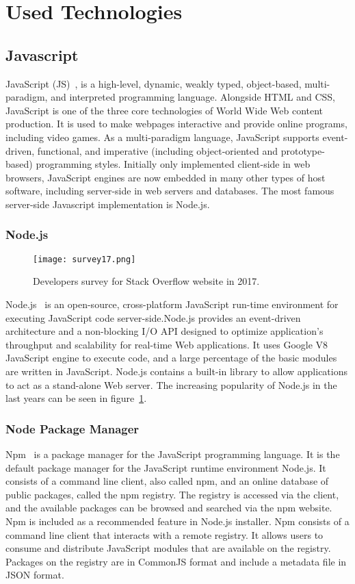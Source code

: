 \section{Used Technologies}

\subsection{Javascript}
JavaScript (JS)~\cite{crockford2008javascript}, is a high-level, dynamic, weakly typed, object-based, multi-paradigm, and interpreted programming language. Alongside HTML and CSS, JavaScript is one of the three core technologies of World Wide Web content production. It is used to make webpages interactive and provide online programs, including video games. As a multi-paradigm language, JavaScript supports event-driven, functional, and imperative (including object-oriented and prototype-based) programming styles. Initially only implemented client-side in web browsers, JavaScript engines are now embedded in many other types of host software, including server-side in web servers and databases. The most famous server-side Javascript implementation is Node.js.

\subsubsection{Node.js}
\begin{figure}
	\texttt{[image: survey17.png]}
	\caption{Developers survey for Stack Overflow website in 2017.}
	\label{survey17}
\end{figure}
Node.js~\cite{tilkov2010node} is an open-source, cross-platform JavaScript run-time environment for executing JavaScript code server-side.Node.js provides an event-driven architecture and a non-blocking I/O API designed to optimize application's throughput and scalability for real-time Web applications. It uses Google V8 JavaScript engine to execute code, and a large percentage of the basic modules are written in JavaScript. Node.js contains a built-in library to allow applications to act as a stand-alone Web server. The increasing popularity of Node.js in the last years can be seen in figure~\ref{survey17}.

\subsubsection{Node Package Manager}
Npm~\cite{schlueternode} is a package manager for the JavaScript programming language. It is the default package manager for the JavaScript runtime environment Node.js. It consists of a command line client, also called npm, and an online database of public packages, called the npm registry. The registry is accessed via the client, and the available packages can be browsed and searched via the npm website. Npm is included as a recommended feature in Node.js installer. Npm consists of a command line client that interacts with a remote registry. It allows users to consume and distribute JavaScript modules that are available on the registry. Packages on the registry are in CommonJS format and include a metadata file in JSON format.

